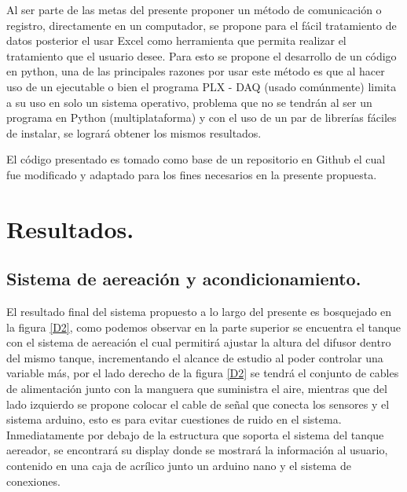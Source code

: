 \documentclass[11pt,letter
								]
								{article}
\begin{document}
Al ser parte de las metas del presente proponer un método de comunicación o registro, directamente en un computador, se propone para el fácil tratamiento de datos posterior el usar Excel como herramienta que permita realizar el tratamiento que el usuario desee. Para esto se propone el desarrollo de un código en python, una de las principales razones por usar este método es que al hacer uso de un ejecutable o bien el programa  PLX - DAQ (usado comúnmente) limita a su uso en solo un sistema operativo, problema que no se tendrán al ser un programa en Python (multiplataforma) y con el uso de un par de librerías fáciles de instalar, se logrará obtener los mismos resultados. 

El código presentado es tomado como base de un  repositorio en Github \cite{Git} el cual fue modificado y adaptado para los fines necesarios en la presente propuesta.\\


	
	\newpage




\section{Resultados. }

	
		\subsection{Sistema de aereación y acondicionamiento. }

		

		El resultado final del sistema propuesto a lo largo del presente  es bosquejado en   
	  la figura \ref{D2}, como podemos observar 
		en la parte superior se encuentra el tanque con el  sistema de aereación el cual permitirá ajustar la  altura del difusor dentro del mismo tanque,   incrementando el alcance de estudio al poder controlar una variable más, por el lado derecho   de la figura \ref{D2}  se tendrá  el  conjunto de cables de alimentación junto con la manguera que suministra el aire, mientras que del lado izquierdo se propone colocar  el cable de señal que conecta los sensores y el sistema arduino, esto es para evitar  cuestiones de ruido en el sistema. %
Inmediatamente por debajo de la estructura que soporta  el sistema del tanque aereador, se encontrará su display donde se mostrará la información al usuario, contenido en una caja de acrílico junto un arduino nano y el sistema de conexiones.\\
\end{document}
